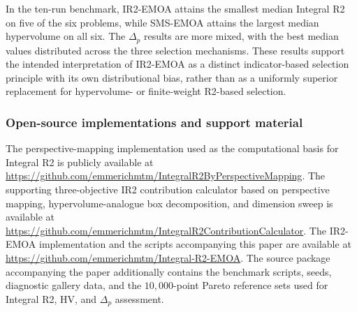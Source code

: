 \documentclass[runningheads]{llncs}
\begin{document}
In the ten-run benchmark, IR2-EMOA attains the smallest median Integral R2 on five of the six problems, while SMS-EMOA attains the largest median hypervolume on all six. The $\Delta_p$ results are more mixed, with the best median values distributed across the three selection mechanisms. These results support the intended interpretation of IR2-EMOA as a distinct indicator-based selection principle with its own distributional bias, rather than as a uniformly superior replacement for hypervolume- or finite-weight R2-based selection.

\subsubsection*{Open-source implementations and support material}
The perspective-mapping implementation used as the computational basis for Integral R2 is publicly available at
\url{https://github.com/emmerichmtm/IntegralR2ByPerspectiveMapping}.
The supporting three-objective IR2 contribution calculator based on perspective mapping, hypervolume-analogue box decomposition, and dimension sweep is available at
\url{https://github.com/emmerichmtm/IntegralR2ContributionCalculator}.
The IR2-EMOA implementation and the scripts accompanying this paper are available at
\url{https://github.com/emmerichmtm/Integral-R2-EMOA}.
The source package accompanying the paper additionally contains the benchmark scripts, seeds, diagnostic gallery data, and the $10{,}000$-point Pareto reference sets used for Integral R2, HV, and $\Delta_p$ assessment.
\end{document}
